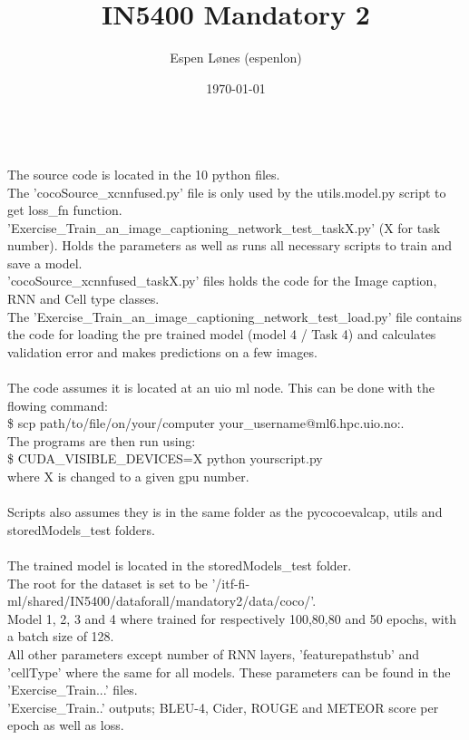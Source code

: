 \documentclass[12pt, letterpaper, twoside]{article}
\begin{document}
\title{IN5400 Mandatory 2}
\author{Espen Lønes (espenlon)}
\date{\today}
\maketitle
\ \\
The source code is located in the 10 python files.\\
The 'cocoSource\_xcnnfused.py' file is only used by the utils.model.py script to get loss\_fn function.\\
'Exercise\_Train\_an\_image\_captioning\_network\_test\_taskX.py' (X for task number). Holds the parameters as well as runs all necessary scripts to train and save a model.\\
'cocoSource\_xcnnfused\_taskX.py' files holds the code for the Image caption, RNN and Cell type classes.\\
The 'Exercise\_Train\_an\_image\_captioning\_network\_test\_load.py' file contains the code for loading the pre trained model (model 4 / Task 4) and calculates validation error and makes predictions on a few images.\\
\ \\
The code assumes it is located at an uio ml node. This can be done with the flowing command:\\
\$ scp path/to/file/on/your/computer your\_username@ml6.hpc.uio.no:.\\
The programs are then run using:\\
\$ CUDA\_VISIBLE\_DEVICES=X python yourscript.py\\
where X is changed to a given gpu number.\\
\ \\
Scripts also assumes they is in the same folder as the pycocoevalcap, utils and storedModels\_test folders.\\
\ \\
The trained model is located in the storedModels\_test folder.\\
The root for the dataset is set to be '/itf-fi-ml/shared/IN5400/dataforall/mandatory2/data/coco/'.\\
Model 1, 2, 3 and 4 where trained for respectively 100,80,80 and 50 epochs, with a batch size of 128.\\
All other parameters except number of RNN layers, 'featurepathstub' and 'cellType' where the same for all models. These parameters can be found in the 'Exercise\_Train...' files.\\
'Exercise\_Train..' outputs; BLEU-4, Cider, ROUGE and METEOR score per epoch as well as loss.\\
\end{document}
